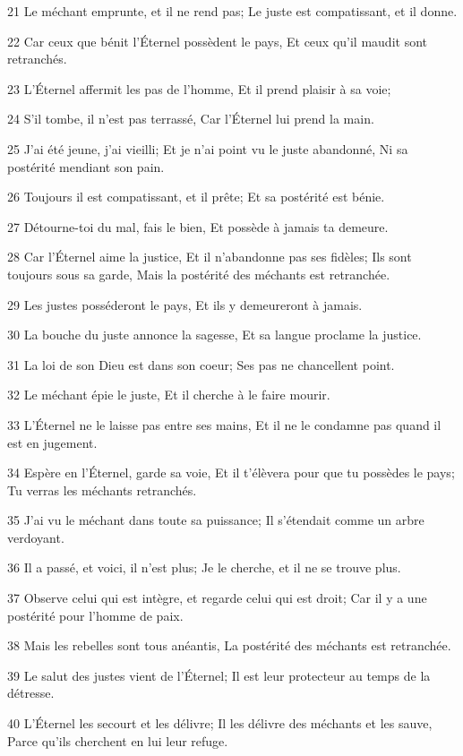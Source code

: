 \par 21 Le méchant emprunte, et il ne rend pas; Le juste est compatissant, et il donne.
\par 22 Car ceux que bénit l'Éternel possèdent le pays, Et ceux qu'il maudit sont retranchés.
\par 23 L'Éternel affermit les pas de l'homme, Et il prend plaisir à sa voie;
\par 24 S'il tombe, il n'est pas terrassé, Car l'Éternel lui prend la main.
\par 25 J'ai été jeune, j'ai vieilli; Et je n'ai point vu le juste abandonné, Ni sa postérité mendiant son pain.
\par 26 Toujours il est compatissant, et il prête; Et sa postérité est bénie.
\par 27 Détourne-toi du mal, fais le bien, Et possède à jamais ta demeure.
\par 28 Car l'Éternel aime la justice, Et il n'abandonne pas ses fidèles; Ils sont toujours sous sa garde, Mais la postérité des méchants est retranchée.
\par 29 Les justes posséderont le pays, Et ils y demeureront à jamais.
\par 30 La bouche du juste annonce la sagesse, Et sa langue proclame la justice.
\par 31 La loi de son Dieu est dans son coeur; Ses pas ne chancellent point.
\par 32 Le méchant épie le juste, Et il cherche à le faire mourir.
\par 33 L'Éternel ne le laisse pas entre ses mains, Et il ne le condamne pas quand il est en jugement.
\par 34 Espère en l'Éternel, garde sa voie, Et il t'élèvera pour que tu possèdes le pays; Tu verras les méchants retranchés.
\par 35 J'ai vu le méchant dans toute sa puissance; Il s'étendait comme un arbre verdoyant.
\par 36 Il a passé, et voici, il n'est plus; Je le cherche, et il ne se trouve plus.
\par 37 Observe celui qui est intègre, et regarde celui qui est droit; Car il y a une postérité pour l'homme de paix.
\par 38 Mais les rebelles sont tous anéantis, La postérité des méchants est retranchée.
\par 39 Le salut des justes vient de l'Éternel; Il est leur protecteur au temps de la détresse.
\par 40 L'Éternel les secourt et les délivre; Il les délivre des méchants et les sauve, Parce qu'ils cherchent en lui leur refuge.

